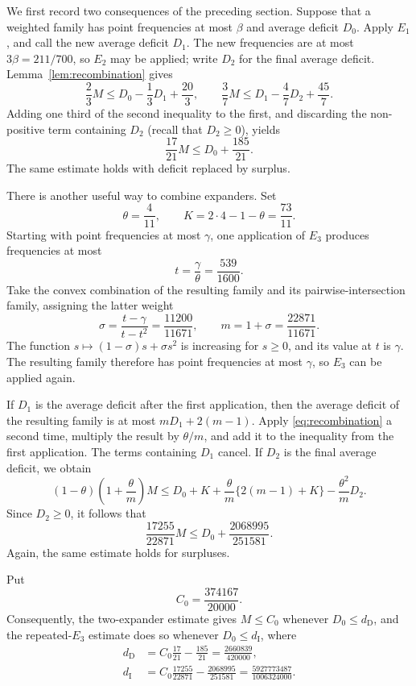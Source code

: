 \documentclass[11pt,a4paper]{amsart}
\begin{document}
We first record two consequences of the preceding section.  Suppose that a
weighted family has point frequencies at most \(\beta\) and average deficit
\(D_0\).  Apply \(E_1\), and call the new average deficit \(D_1\).  The new
frequencies are at most \(3\beta=211/700\), so \(E_2\) may be applied; write
\(D_2\) for the final average deficit.  Lemma~\ref{lem:recombination} gives
\[
 \frac23M\leqslant D_0-\frac13D_1+\frac{20}{3},
 \qquad
 \frac37M\leqslant D_1-\frac47D_2+\frac{45}{7}.
\]
Adding one third of the second inequality to the first, and discarding the
non-positive term containing \(D_2\) (recall that \(D_2\geqslant0\)), yields
\begin{equation}\label{eq:direct-estimate}
        \frac{17}{21}M\leqslant D_0+\frac{185}{21}.
\end{equation}
The same estimate holds with deficit replaced by surplus.

There is another useful way to combine expanders.  Set
\[
        \theta=\frac4{11},\qquad
        K=2\cdot4-1-\theta=\frac{73}{11}.
\]
Starting with point frequencies at most \(\gamma\), one application of
\(E_3\) produces frequencies at most
\[
        t=\frac{\gamma}{\theta}=\frac{539}{1600}.
\]
Take the convex combination of the resulting family and its
pairwise-intersection family, assigning the latter weight
\[
        \sigma=\frac{t-\gamma}{t-t^2}=\frac{11200}{11671},
 \qquad
        m=1+\sigma=\frac{22871}{11671}.
\]
The function \(s\mapsto(1-\sigma)s+\sigma s^2\) is increasing for
\(s\geqslant0\), and its value at \(t\) is \(\gamma\).  The resulting
family therefore has point frequencies at most \(\gamma\), so \(E_3\) can be
applied again.

If \(D_1\) is the average deficit after the first application, then the
average deficit of the resulting family is at most
\(mD_1+2(m-1)\).  Apply \eqref{eq:recombination} a second time, multiply the
result by \(\theta/m\), and add it to the inequality from the first
application.  The terms containing \(D_1\) cancel.  If \(D_2\) is the final
average deficit, we obtain
\[
 (1-\theta)\left(1+\frac{\theta}{m}\right)M
 \leqslant
 D_0+K+\frac{\theta}{m}\{2(m-1)+K\}
 -\frac{\theta^2}{m}D_2.
\]
Since \(D_2\geqslant0\), it follows that
\begin{equation}\label{eq:repeated-estimate}
        \frac{17255}{22871}M
        \leqslant D_0+\frac{2068995}{251581}.
\end{equation}
Again, the same estimate holds for surpluses.

Put
\[
        C_0=\frac{374167}{20000}.
\]
Consequently, the two-expander estimate gives \(M\leqslant C_0\) whenever
\(D_0\leqslant d_{\mathrm D}\), and the repeated-\(E_3\) estimate does so
whenever \(D_0\leqslant d_{\mathrm I}\), where
\begin{align}
 d_{\mathrm D}
 &=
 C_0\frac{17}{21}-\frac{185}{21}
 =\frac{2660839}{420000},\label{eq:dD}\\
 d_{\mathrm I}
 &=
 C_0\frac{17255}{22871}
 -\frac{2068995}{251581}
 =\frac{5927773487}{1006324000}.\label{eq:dI}
\end{align}
\end{document}
